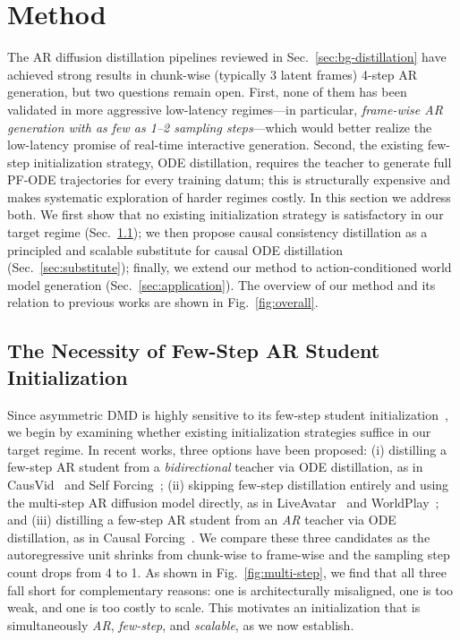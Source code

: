 \section{Method}
\label{sec: method}



The AR diffusion distillation pipelines reviewed in Sec.~\ref{sec:bg-distillation} have achieved strong results in chunk-wise (typically 3 latent frames) 4-step AR generation, but two questions remain open. First, none of them has been validated in more aggressive low-latency regimes---in particular, \emph{frame-wise AR generation with as few as 1--2 sampling steps}---which would better realize the low-latency promise of real-time interactive generation. Second, the existing few-step initialization strategy, ODE distillation, requires the teacher to generate full PF-ODE trajectories for every training datum; this is structurally expensive and makes systematic exploration of harder regimes costly. In this section we address both. We first show that no existing initialization strategy is satisfactory in our target regime (Sec.~\ref{sec:necessity}); we then propose causal consistency distillation as a principled and scalable substitute for causal ODE distillation (Sec.~\ref{sec:substitute}); finally, we extend our method to action-conditioned world model generation (Sec.~\ref{sec:application}). The overview of our method and its relation to previous works are shown in Fig.~\ref{fig:overall}.

\subsection{The Necessity of Few-Step AR Student Initialization}
\label{sec:necessity}

Since asymmetric DMD is highly sensitive to its few-step student initialization~\cite{zhu2026causal}, we begin by examining whether existing initialization strategies suffice in our target regime. In recent works, three options have been proposed: (i) distilling a few-step AR student from a \emph{bidirectional} teacher via ODE distillation, as in CausVid~\cite{yin2025slow} and Self Forcing~\cite{huang2025self}; (ii) skipping few-step distillation entirely and using the multi-step AR diffusion model directly, as in LiveAvatar~\cite{huang2025live} and WorldPlay~\cite{sun2025worldplay}; and (iii) distilling a few-step AR student from an \emph{AR} teacher via ODE distillation, as in Causal Forcing~\cite{zhu2026causal}. We compare these three candidates as the autoregressive unit shrinks from chunk-wise to frame-wise and the sampling step count drops from 4 to 1. As shown in Fig.~\ref{fig:multi-step}, we find that all three fall short for complementary reasons: one is architecturally misaligned, one is too weak, and one is too costly to scale. This motivates an initialization that is simultaneously \emph{AR}, \emph{few-step}, and \emph{scalable}, as we now establish.

